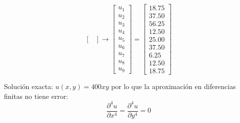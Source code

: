 \documentclass[9pt, aspectratio=169]{beamer}
\begin{document}
\begin{frame}
\[\begin{bmatrix}
    \end{bmatrix}
    \rightarrow
    \begin{bmatrix} u_1 \\ u_2 \\ u_3 \\ u_4 \\ u_5 \\ u_6 \\ u_7 \\ u_8 \\ u_9 \end{bmatrix} = 
    \begin{bmatrix} 18.75 \\ 37.50 \\ 56.25 \\ 12.50 \\ 25.00 \\ 37.50 \\ 6.25 \\ 12.50 \\ 18.75 \end{bmatrix}
\] \pause

\alert{Solución exacta:} $u(x, y) = 400 xy$ por lo que la aproximación en diferencias finitas no tiene error:
\[ \frac{\partial^4 u}{\partial x^4} = \frac{\partial^4 u}{\partial y^4} = 0 \]
\end{frame}
\end{document}
